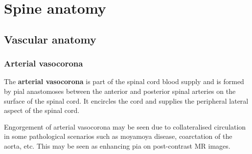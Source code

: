 \chapter{Spine anatomy}

\section{Vascular anatomy}

\subsection{Arterial vasocorona}

The \textbf{arterial vasocorona} is part of the spinal cord blood supply and is formed by pial anastomoses between the anterior and posterior spinal arteries on the surface of the spinal cord. It encircles the cord and supplies the peripheral lateral aspect of the spinal cord.

Engorgement of arterial vasocorona may be seen due to collateralised circulation in some pathological scenarios such as moyamoya disease, coarctation of the aorta, etc. This may be seen as enhancing pia on post-contrast MR images.